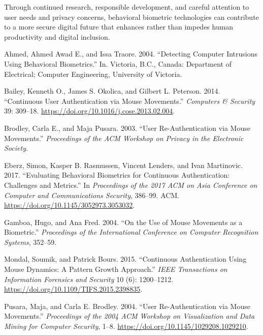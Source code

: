 \documentclass[
  11pt,
  a4paper,
]{article}
\newlength{\cslhangindent}
\newenvironment{CSLReferences}[2] %
 {\begin{list}{}{%
  \setlength{\itemindent}{0pt}
  \setlength{\leftmargin}{0pt}
  \setlength{\parsep}{0pt}
  \ifodd #1
   \setlength{\leftmargin}{\cslhangindent}
   \setlength{\itemindent}{-1\cslhangindent}
  \fi
  \setlength{\itemsep}{#2\baselineskip}}}
 {\end{list}}
\begin{document}
Through continued research, responsible development, and careful
attention to user needs and privacy concerns, behavioral biometric
technologies can contribute to a more secure digital future that
enhances rather than impedes human productivity and digital inclusion.

\newpage

\label{refs}
\begin{CSLReferences}{1}{0}
Ahmed, Ahmed Awad E., and Issa Traore. 2004. {``Detecting Computer
Intrusions Using Behavioral Biometrics.''} In. Victoria, B.C., Canada:
Department of Electrical; Computer Engineering, University of Victoria.

Bailey, Kenneth O., James S. Okolica, and Gilbert L. Peterson. 2014.
{``Continuous User Authentication via Mouse Movements.''}
\emph{Computers \& Security} 39: 309--18.
\url{https://doi.org/10.1016/j.cose.2013.02.004}.

Brodley, Carla E., and Maja Pusara. 2003. {``User Re-Authentication via
Mouse Movements.''} \emph{Proceedings of the ACM Workshop on Privacy in
the Electronic Society}.

Eberz, Simon, Kasper B. Rasmussen, Vincent Lenders, and Ivan Martinovic.
2017. {``Evaluating Behavioral Biometrics for Continuous Authentication:
Challenges and Metrics.''} In \emph{Proceedings of the 2017 ACM on Asia
Conference on Computer and Communications Security}, 386--99. ACM.
\url{https://doi.org/10.1145/3052973.3053032}.

Gamboa, Hugo, and Ana Fred. 2004. {``On the Use of Mouse Movements as a
Biometric.''} \emph{Proceedings of the International Conference on
Computer Recognition Systems}, 352--59.

Mondal, Soumik, and Patrick Bours. 2015. {``Continuous Authentication
Using Mouse Dynamics: A Pattern Growth Approach.''} \emph{IEEE
Transactions on Information Forensics and Security} 10 (6): 1200--1212.
\url{https://doi.org/10.1109/TIFS.2015.2398835}.

Pusara, Maja, and Carla E. Brodley. 2004. {``User Re-Authentication via
Mouse Movements.''} \emph{Proceedings of the 2004 ACM Workshop on
Visualization and Data Mining for Computer Security}, 1--8.
\url{https://doi.org/10.1145/1029208.1029210}.


\end{CSLReferences}
\end{document}
